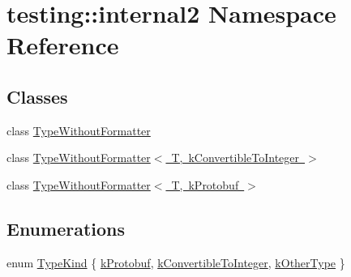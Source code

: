 \hypertarget{namespacetesting_1_1internal2}{}\section{testing\+::internal2 Namespace Reference}
\label{namespacetesting_1_1internal2}
\subsection*{Classes}
\begin{DoxyCompactItemize}
\item 
class \mbox{\hyperlink{classtesting_1_1internal2_1_1TypeWithoutFormatter}{Type\+Without\+Formatter}}
\item 
class \mbox{\hyperlink{classtesting_1_1internal2_1_1TypeWithoutFormatter_3_01T_00_01kConvertibleToInteger_01_4}{Type\+Without\+Formatter$<$ T, k\+Convertible\+To\+Integer $>$}}
\item 
class \mbox{\hyperlink{classtesting_1_1internal2_1_1TypeWithoutFormatter_3_01T_00_01kProtobuf_01_4}{Type\+Without\+Formatter$<$ T, k\+Protobuf $>$}}
\end{DoxyCompactItemize}
\subsection*{Enumerations}
\begin{DoxyCompactItemize}
\item 
enum \mbox{\hyperlink{namespacetesting_1_1internal2_aeb8161b0b3ee503347b0662d7028fd57}{Type\+Kind}} \{ \mbox{\hyperlink{namespacetesting_1_1internal2_aeb8161b0b3ee503347b0662d7028fd57a14aaf98a2547ecf43eef0868d54b1383}{k\+Protobuf}}, 
\mbox{\hyperlink{namespacetesting_1_1internal2_aeb8161b0b3ee503347b0662d7028fd57a9bdcf3f1548f498b2b7f097306ea0224}{k\+Convertible\+To\+Integer}}, 
\mbox{\hyperlink{namespacetesting_1_1internal2_aeb8161b0b3ee503347b0662d7028fd57abe8aaea44751d6ebd0cdf5bd94451db1}{k\+Other\+Type}}
 \}
\end{DoxyCompactItemize}
